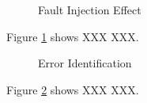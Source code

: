\documentclass[10pt]{report}
\begin{document}
\begin{figure}[p]
    \centering
    \setlength\fboxsep{0pt}
    \setlength\fboxrule{0.5pt}
    \caption{Fault Injection Effect}
    \label{placeholder}
\end{figure}

Figure \ref{placeholder} shows XXX XXX.

\begin{figure}[p]
    \centering
    \setlength\fboxsep{0pt}
    \setlength\fboxrule{0.5pt}
    \caption{Error Identification}
    \label{placeholder-error-identification}
\end{figure}

Figure \ref{placeholder-error-identification} shows XXX XXX.



\end{document}
